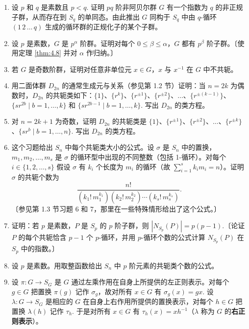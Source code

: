 \begin{enumerate}
\item 设 \(p\) 和 \(q\) 是素数且 \(p < q\). 证明 \(pq\) 阶非阿贝尔群 \(G\) 有一个指数为 \(q\) 的非正规子群，从而存在到 \(S_q\) 的单同态。由此推出 \(G\) 同构于 \(S_q\) 中由 \(q\)-循环 \((1\,2\,\ldots\,q)\) 生成的循环群的正规化子的某个子群。

\item 设 \(p\) 是素数，\(G\) 是 \(p^\alpha\) 阶群。证明对每个 \(0 \leq \beta \leq \alpha\)，\(G\) 都有 \(p^\beta\) 阶子群。〔使用定理 \ref{thm:4.8} 并对 \(\alpha\) 作归纳。〕

\item 若 \(G\) 是奇数阶群，证明对任意非单位元 \(x \in G\)，\(x\) 与 \(x^{-1}\) 在 \(G\) 中不共轭。

\item 用二面体群 \(D_{2n}\) 的通常生成元与关系（参见第 1.2 节）证明：当 \(n = 2k\) 为偶数时，\(D_{2n}\) 的共轭类如下：\(\{1\}\)、\(\{r^k\}\)、\(\{r^{\pm 1}\}\)、\(\{r^{\pm 2}\}\)、\(\ldots\)、\(\{r^{\pm(k-1)}\}\)、\(\{sr^{2b} \mid b = 1, \ldots, k\}\) 和 \(\{sr^{2b-1} \mid b = 1, \ldots, k\}\). 写出 \(D_{2n}\) 的类方程。

\item 对 \(n = 2k + 1\) 为奇数，证明 \(D_{2n}\) 的共轭类是 \(\{1\}\)、\(\{r^{\pm 1}\}\)、\(\{r^{\pm 2}\}\)、\(\ldots\)、\(\{r^{\pm k}\}\)、\(\{sr^b \mid b = 1, \ldots, n\}\). 写出 \(D_{2n}\) 的类方程。

\item 这个习题给出 \(S_n\) 中每个共轭类大小的公式。设 \(\sigma\) 是 \(S_n\) 中的置换，\(m_1, m_2, \ldots, m_s\) 是 \(\sigma\) 的循环型中出现的不同整数（包括 1-循环）。对每个 \(i \in \{1, 2, \ldots, s\}\) 假设 \(\sigma\) 有 \(k_i\) 个长度为 \(m_i\) 的循环（故 \(\sum_{i=1}^{s} k_i m_i = n\)）。证明 \(\sigma\) 的共轭个数为
\[
\frac{n!}{(k_1!\, m_1^{k_1})(k_2!\, m_2^{k_2}) \cdots (k_s!\, m_s^{k_s})}.
\]
〔参见第 1.3 节习题 6 和 7，那里在一些特殊情形给出了这个公式。〕

\item 证明：若 \(p\) 是素数，\(P\) 是 \(S_p\) 的 \(p\) 阶子群，则 \(|N_{S_p}(P)| = p(p-1)\).〔论证 \(P\) 的每个共轭恰含 \(p-1\) 个 \(p\)-循环，并用 \(p\)-循环个数的公式计算 \(N_{S_p}(P)\) 在 \(S_p\) 中的指数。〕

\item 设 \(p\) 是素数。用取整函数给出 \(S_n\) 中 \(p\) 阶元素的共轭类个数的公式。

\item 设 \(\pi : G \to S_G\) 是 \(G\) 通过左乘作用在自身上所提供的左正则表示。对每个 \(g \in G\) 把置换 \(\pi(g)\) 记作 \(\sigma_g\)，故对所有 \(x \in G\) 有 \(\sigma_g(x) = gx\). 设 \(\lambda : G \to S_G\) 是相应的 \(G\) 在自身上右作用所提供的置换表示，对每个 \(h \in G\) 把置换 \(\lambda(h)\) 记作 \(\tau_h\). 于是对所有 \(x \in G\) 有 \(\tau_h(x) = xh^{-1}\)（\(\lambda\) 称为 \(G\) 的\textbf{右正则表示}）。


\end{enumerate}
